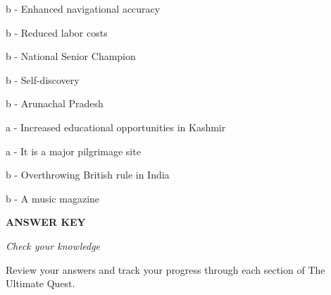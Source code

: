 \documentclass[12pt,a4paper]{book}
\renewcommand{\sectioncover}[3]{%
  \cleardoublepage
  \thispagestyle{empty}
  \begin{center}
    \vspace*{2cm}
    {\huge\bfseries\textcolor{questblue}{#1}\par}
    \vspace{0.7cm}
    {\Large\textit{#2}\par}
    \vspace{1.2cm}
    \begin{tcolorbox}[
      enhanced,
      colback=white,
      colframe=questorange,
      arc=5mm,
      boxrule=0.5mm,
      width=0.7\textwidth,
      halign=center,
      valign=center,
      height=5cm
    ]
      \begin{center}
        {\large #3\par}
      \end{center}
    \end{tcolorbox}
    \vspace{1.5cm}
  \end{center}
  \cleardoublepage
}
\begin{document}
\begin{enhancedmcq}[Question 42]{b - Enhanced navigational accuracy}
\end{enhancedmcq}

\begin{enhancedmcq}[Question 43]{b - Reduced labor costs}
\end{enhancedmcq}

\begin{enhancedmcq}[Question 44]{b - National Senior Champion}
\end{enhancedmcq}

\begin{enhancedmcq}[Question 45]{b - Self-discovery}
\end{enhancedmcq}

\begin{enhancedmcq}[Question 46]{b - Arunachal Pradesh}
\end{enhancedmcq}

\begin{enhancedmcq}[Question 47]{a - Increased educational opportunities in Kashmir}
\end{enhancedmcq}

\begin{enhancedmcq}[Question 48]{a - It is a major pilgrimage site}
\end{enhancedmcq}

\begin{enhancedmcq}[Question 49]{b - Overthrowing British rule in India}
\end{enhancedmcq}

\begin{enhancedmcq}[Question 50]{b - A music magazine}
\end{enhancedmcq}



\sectioncover{ANSWER KEY}{Check your knowledge}{Review your answers and track your progress through each section of The Ultimate Quest.}
\end{document}
